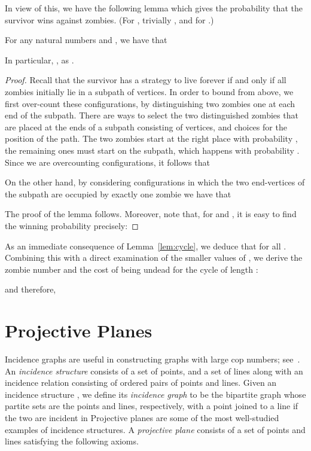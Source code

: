 \documentclass[12pt]{amsart}
\begin{document}
\bigskip

In view of this, we have the following lemma which gives the probability that the survivor wins against  zombies. (For , trivially , and   for .)

\begin{lemma}\label{lem:cycle}
For any natural numbers  and , we have that

In particular, , as .
\end{lemma}

\begin{proof}
Recall that the survivor has a strategy to live forever if and only if all zombies initially lie in a subpath of  vertices. In order to bound  from above, we first over-count these configurations, by distinguishing two zombies one at each end of the subpath.
There are  ways to select the two distinguished zombies that are placed at the ends of a subpath consisting of  vertices, and  choices for the position of the path. The two zombies start at the right place with probability , the remaining ones must start on the subpath, which happens
with probability . Since we are overcounting configurations, it follows that

On the other hand, by considering configurations in which the two end-vertices of the subpath are occupied by exactly one zombie we have that

The proof of the lemma follows. Moreover, note that,
for  and , it is easy to find the winning probability precisely:

\end{proof}

As an immediate consequence of Lemma~\ref{lem:cycle}, we deduce that  for all . Combining this with a direct examination of the smaller values of , we derive the zombie number and the cost of being undead for the cycle  of length :
\begin{theorem}\label{cycle}

and therefore,

\end{theorem}


\section{Projective Planes}\label{secproj}

Incidence graphs are useful in constructing graphs with large cop numbers; see~\cite{Designs,p}. An \emph{incidence structure} consists of a set  of points, and a set  of lines along with an
incidence relation consisting of ordered pairs of points and lines. Given an incidence structure , we define its \emph{incidence graph}  to be the bipartite graph whose partite sets are the points and lines, respectively, with a point joined to a line if the two are incident in   Projective planes are some of the most well-studied examples of incidence
structures. A \emph{projective plane} consists of a set of points and lines satisfying the following axioms.
\end{document}
